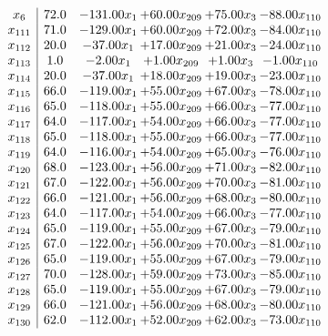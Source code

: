 \documentclass[8pt]{article}
\begin{document}
\[\begin{array}{c| c c@{\hskip 2pt} c@{\hskip 2pt} c@{\hskip 2pt} c@{\hskip 2pt} }
 x_{6}   &  72.0 & -131.00 x_{1} & + 60.00 x_{209} & + 75.00 x_{3} & -88.00 x_{110}\\
 x_{111}   &  71.0 & -129.00 x_{1} & + 60.00 x_{209} & + 72.00 x_{3} & -84.00 x_{110}\\
 x_{112}   &  20.0 & -37.00 x_{1} & + 17.00 x_{209} & + 21.00 x_{3} & -24.00 x_{110}\\
 x_{113}   &  1.0 & -2.00 x_{1} & +  1.00 x_{209} & +  1.00 x_{3} & -1.00 x_{110}\\
 x_{114}   &  20.0 & -37.00 x_{1} & + 18.00 x_{209} & + 19.00 x_{3} & -23.00 x_{110}\\
 x_{115}   &  66.0 & -119.00 x_{1} & + 55.00 x_{209} & + 67.00 x_{3} & -78.00 x_{110}\\
 x_{116}   &  65.0 & -118.00 x_{1} & + 55.00 x_{209} & + 66.00 x_{3} & -77.00 x_{110}\\
 x_{117}   &  64.0 & -117.00 x_{1} & + 54.00 x_{209} & + 66.00 x_{3} & -77.00 x_{110}\\
 x_{118}   &  65.0 & -118.00 x_{1} & + 55.00 x_{209} & + 66.00 x_{3} & -77.00 x_{110}\\
 x_{119}   &  64.0 & -116.00 x_{1} & + 54.00 x_{209} & + 65.00 x_{3} & -76.00 x_{110}\\
 x_{120}   &  68.0 & -123.00 x_{1} & + 56.00 x_{209} & + 71.00 x_{3} & -82.00 x_{110}\\
 x_{121}   &  67.0 & -122.00 x_{1} & + 56.00 x_{209} & + 70.00 x_{3} & -81.00 x_{110}\\
 x_{122}   &  66.0 & -121.00 x_{1} & + 56.00 x_{209} & + 68.00 x_{3} & -80.00 x_{110}\\
 x_{123}   &  64.0 & -117.00 x_{1} & + 54.00 x_{209} & + 66.00 x_{3} & -77.00 x_{110}\\
 x_{124}   &  65.0 & -119.00 x_{1} & + 55.00 x_{209} & + 67.00 x_{3} & -79.00 x_{110}\\
 x_{125}   &  67.0 & -122.00 x_{1} & + 56.00 x_{209} & + 70.00 x_{3} & -81.00 x_{110}\\
 x_{126}   &  65.0 & -119.00 x_{1} & + 55.00 x_{209} & + 67.00 x_{3} & -79.00 x_{110}\\
 x_{127}   &  70.0 & -128.00 x_{1} & + 59.00 x_{209} & + 73.00 x_{3} & -85.00 x_{110}\\
 x_{128}   &  65.0 & -119.00 x_{1} & + 55.00 x_{209} & + 67.00 x_{3} & -79.00 x_{110}\\
 x_{129}   &  66.0 & -121.00 x_{1} & + 56.00 x_{209} & + 68.00 x_{3} & -80.00 x_{110}\\
 x_{130}   &  62.0 & -112.00 x_{1} & + 52.00 x_{209} & + 62.00 x_{3} & -73.00 x_{110}\\

\end{array}\]
\end{document}

